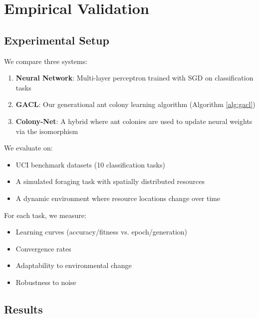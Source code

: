 \documentclass[12pt,letterpaper]{article}
\begin{document}
\section{Empirical Validation}

\subsection{Experimental Setup}

We compare three systems:
\begin{enumerate}
    \item \textbf{Neural Network}: Multi-layer perceptron trained with SGD on classification tasks
    \item \textbf{GACL}: Our generational ant colony learning algorithm (Algorithm \ref{alg:gacl})
    \item \textbf{Colony-Net}: A hybrid where ant colonies are used to update neural weights via the isomorphism
\end{enumerate}

We evaluate on:
\begin{itemize}
    \item UCI benchmark datasets (10 classification tasks)
    \item A simulated foraging task with spatially distributed resources
    \item A dynamic environment where resource locations change over time
\end{itemize}

For each task, we measure:
\begin{itemize}
    \item Learning curves (accuracy/fitness vs. epoch/generation)
    \item Convergence rates
    \item Adaptability to environmental change
    \item Robustness to noise
\end{itemize}

\subsection{Results}
\end{document}
